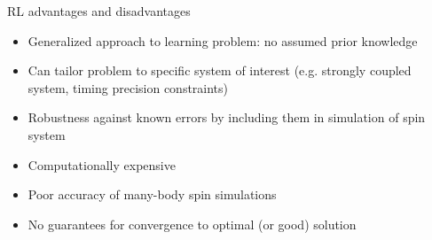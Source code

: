 \documentclass{beamer}
\begin{document}
\begin{frame}{RL advantages and disadvantages}

\begin{itemize}
    \item Generalized approach to learning problem: no assumed prior knowledge
    \item Can tailor problem to specific system of interest (e.g. strongly coupled system, timing precision constraints)
    \item Robustness against known errors by including them in simulation of spin system
\end{itemize}

\pause

\begin{itemize}
    \color{red}
    \item Computationally expensive
    \item Poor accuracy of many-body spin simulations
    \item No guarantees for convergence to optimal (or good) solution
\end{itemize}

\end{frame}
\end{document}
